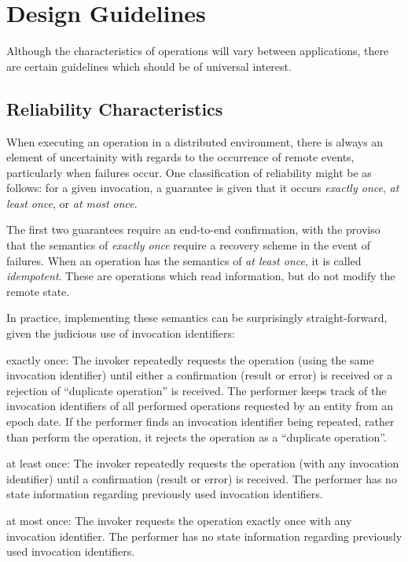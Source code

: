 \section	{Design Guidelines}
Although the characteristics of operations will vary between applications,
there are certain guidelines which should be of universal interest.

\subsection	{Reliability Characteristics}
When executing an operation in a distributed environment,
there is always an element of uncertainity with regards to the occurrence of
remote events,
particularly when failures occur.
One classification of reliability might be as follows:
for a given invocation,
a guarantee is given that it occurs {\em exactly once},
{\em at least once}, or {\em at most once}.

The first two guarantees require an end-to-end confirmation,
with the proviso that the semantics of {\em exactly once\/} require a
recovery scheme in the event of failures.
When an operation has the semantics of {\em at least once},
it is called {\em idempotent}.
These are operations which read information,
but do not modify the remote state.

In practice,
implementing these semantics can be surprisingly straight-forward,
given the judicious use of invocation identifiers:
\begin{describe}
\item[exactly once:] The invoker repeatedly requests the operation
(using the same invocation identifier)
until either a confirmation (result or error) is received
or a rejection of ``duplicate operation'' is received.
The performer keeps track of the invocation identifiers of all
performed operations requested by an entity from an epoch date.
If the performer finds an invocation identifier being repeated,
rather than perform the operation,
it rejects the operation as a ``duplicate operation''.

\item[at least once:] The invoker repeatedly requests the operation
(with any invocation identifier)
until a confirmation (result or error) is received.
The performer has no state information regarding previously used invocation
identifiers.

\item[at most once:] The invoker requests the operation exactly once with any
invocation identifier.
The performer has no state information regarding previously used invocation
identifiers.
\end{describe}

